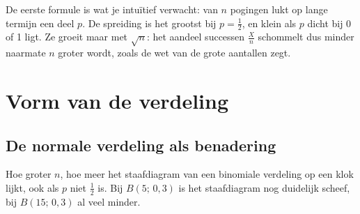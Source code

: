 De eerste formule is wat je intuïtief verwacht: van $n$ pogingen lukt op lange termijn een deel $p$. De spreiding is het grootst bij $p = \frac12$, en klein als $p$ dicht bij 0 of 1 ligt. Ze groeit maar met $\sqrt{n}$: het aandeel successen $\frac{X}{n}$ schommelt dus minder naarmate $n$ groter wordt, zoals de wet van de grote aantallen zegt.


\begin{oefeningen}

\end{oefeningen}

\section{Vorm van de verdeling}

\subsection{De normale verdeling als benadering}

Hoe groter $n$, hoe meer het staafdiagram van een binomiale verdeling op een klok lijkt, ook als $p$ niet $\frac12$ is. Bij $B(5;\, 0{,}3)$ is het staafdiagram nog duidelijk scheef, bij $B(15;\, 0{,}3)$ al veel minder.

